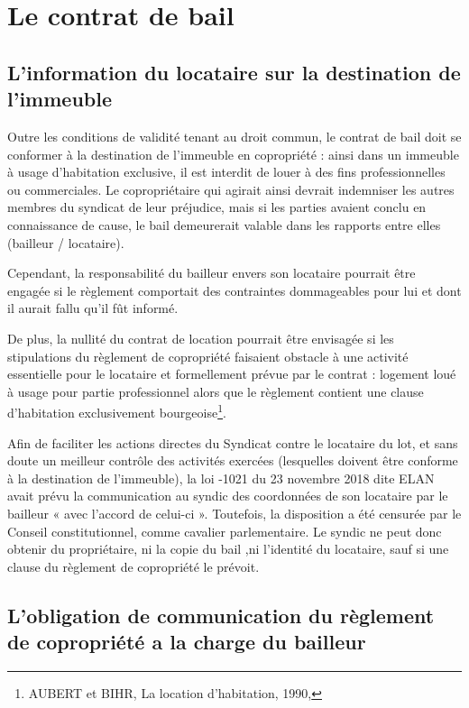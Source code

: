\section{Le contrat de bail}
	
	\subsection{L’information du locataire sur la destination de l’immeuble}
	
		Outre les conditions de validité tenant au droit commun, le contrat de bail doit se conformer à la destination de l'immeuble en copropriété : ainsi dans un immeuble à usage d'habitation exclusive, il est interdit de louer à des fins professionnelles ou commerciales. Le copropriétaire qui agirait ainsi devrait indemniser les autres membres du syndicat de leur préjudice, mais si les parties avaient conclu en connaissance de cause, le bail demeurerait valable dans les rapports entre elles (bailleur / locataire).
		
		Cependant, la responsabilité du bailleur envers son locataire pourrait être engagée si le règlement comportait des contraintes dommageables pour lui et dont il aurait fallu qu'il fût informé.
		
		De plus, la nullité du contrat de location pourrait être envisagée si les stipulations du règlement de copropriété faisaient obstacle à une activité essentielle pour le locataire et formellement prévue par le contrat : logement loué à usage pour partie professionnel alors que le règlement contient une clause d'habitation exclusivement bourgeoise\footnote{AUBERT et BIHR, La location d'habitation, 1990,  }.
		
		Afin de faciliter les actions directes du Syndicat contre le locataire du lot, et sans doute un meilleur contrôle des activités exercées (lesquelles doivent être conforme à la destination de l’immeuble), la loi -1021 du 23 novembre 2018 dite ELAN avait prévu la communication au syndic des coordonnées de son locataire par le bailleur « avec l’accord de celui-ci ». Toutefois, la disposition a été censurée par le Conseil constitutionnel, comme cavalier parlementaire. Le syndic ne peut donc obtenir du propriétaire, ni la copie du bail ,ni l’identité du locataire, sauf si une clause du règlement de copropriété le prévoit.
	
	\subsection{L’obligation de communication du règlement de copropriété a la charge du bailleur}


